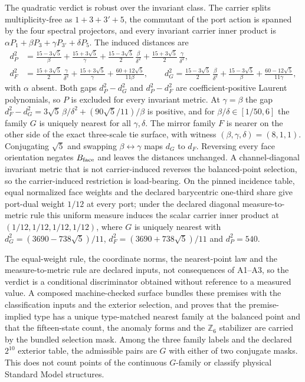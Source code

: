 \documentclass[11pt]{article}
\begin{document}
The quadratic verdict is robust over the invariant class. The carrier splits
multiplicity-free as \(1+3+3'+5\), the commutant of the port action is spanned
by the four spectral projectors, and every invariant carrier inner product is
\(\alpha P_1+\beta P_3+\gamma P_{3'}+\delta P_5\). The induced distances are
\[
\begin{aligned}
 d_P^2&=\frac{15-3\sqrt5}{\beta}+\frac{15+3\sqrt5}{\gamma}
   +\frac{15-3\sqrt5}{2}\,\frac{\beta}{\delta^2}
   +\frac{15+3\sqrt5}{2}\,\frac{\gamma}{\delta^2},\\
 d_F^2&=\frac{15+3\sqrt5}{2}\,\frac{\gamma}{\delta^2}
   +\frac{15+3\sqrt5}{\gamma}+\frac{60+12\sqrt5}{11\beta},\qquad
 d_G^2=\frac{15-3\sqrt5}{2}\,\frac{\beta}{\delta^2}
   +\frac{15-3\sqrt5}{\beta}+\frac{60-12\sqrt5}{11\gamma},
\end{aligned}
\]
with \(\alpha\) absent. Both gaps \(d_P^2-d_G^2\) and \(d_P^2-d_F^2\) are
coefficient-positive Laurent polynomials, so \(P\) is excluded for every
invariant metric. At \(\gamma=\beta\) the gap
\(d_F^2-d_G^2=3\sqrt5\,\beta/\delta^2+(90\sqrt5/11)/\beta\) is positive, and
for \(\beta/\delta\in[1/50,6]\) the family \(G\) is uniquely nearest for all
\(\gamma,\delta\). The mirror family \(F\) is nearer on the other side of the
exact three-scale tie surface, with witness \((\beta,\gamma,\delta)=(8,1,1)\).
Conjugating \(\sqrt5\) and swapping \(\beta\leftrightarrow\gamma\) maps \(d_G\)
to \(d_F\). Reversing every face orientation negates \(B_{\rm face}\) and leaves
the distances unchanged. A channel-diagonal invariant metric that is not
carrier-induced reverses the balanced-point selection, so the carrier-induced
restriction is load-bearing. On the pinned incidence table, equal normalized
face weights and the declared barycentric one-third share give port-dual
weight \(1/12\) at every port; under the declared diagonal measure-to-metric
rule this uniform measure induces the scalar carrier inner product at
\((1/12,1/12,1/12,1/12)\), where \(G\) is uniquely nearest with
\(d_G^2=(3690-738\sqrt5)/11\), \(d_F^2=(3690+738\sqrt5)/11\) and \(d_P^2=540\).

The equal-weight rule, the coordinate norms, the nearest-point law and the
measure-to-metric rule are declared inputs, not consequences of A1--A3, so
the verdict is a conditional discriminator obtained without reference to a
measured value. A composed machine-checked surface bundles these premises
with the classification inputs and the exterior selection, and proves that
the premise-implied type has a unique type-matched nearest family at the
balanced point and that the fifteen-state count, the anomaly forms and the
\(\mathbb Z_6\) stabilizer are carried by the bundled selection mask. Among the
three family labels and the declared \(2^{10}\) exterior table, the admissible
pairs are \(G\) with either of two conjugate masks. This does not count points
of the continuous \(G\)-family or classify physical Standard Model structures.
\end{document}
